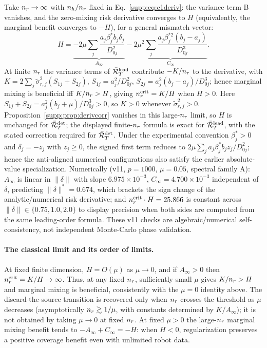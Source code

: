 Take $n_r \to \infty$ with $n_h/n_r$ fixed in Eq.~\eqref{supp:eq:c1deriv}: the variance term B vanishes, and the zero-mixing risk derivative converges to $H$ (equivalently, the marginal benefit converges to $-H$), for a general mismatch vector:
\begin{equation}
  H = \underbrace{-2\mu \sum_j \frac{a_j\beta^*_j b_j \delta_j}{D_{0j}^2}}_{A_\infty} - \underbrace{2\mu^2 \sum_j \frac{a_j\beta_j^{*2}(b_j - a_j)}{D_{0j}^3}}_{C_\infty}.
  \label{supp:eq:h}
\end{equation}
At finite $n_r$ the variance terms of $\bar{\mathcal{R}}_T^{\mathrm{lead}}$ contribute $-K/n_r$ to the derivative, with $K = 2\sum_j\tilde\sigma_{r,j}^2(S_{1j} + S_{2j})$, $S_{1j} = a_j^2/D_{0j}^2$, $S_{2j} = a_j^2(b_j-a_j)/D_{0j}^3$; hence marginal mixing is beneficial iff $K/n_r > H$, giving $n_r^{\mathrm{crit}} = K/H$ when $H > 0$. Here $S_{1j}+S_{2j}=a_j^2(b_j+\mu)/D_{0j}^3>0$, so $K>0$ whenever $\tilde\sigma_{r,j}^2>0$.
Proposition~\ref{supp:prop:derivcorr} vanishes in this large-$n_r$ limit, so $H$ is unchanged for $\bar{\mathcal{R}}_T^{\det}$; the displayed finite-$n_r$ formula is exact for $\bar{\mathcal{R}}_T^{\mathrm{lead}}$, with the stated correction required for $\bar{\mathcal{R}}_T^{\det}$.
Under the experimental convention $\beta_j^*>0$ and $\delta_j=-z_j$ with $z_j\ge0$, the signed first term reduces to $2\mu\sum_j a_j\beta_j^*b_jz_j/D_{0j}^2$; hence the anti-aligned numerical configurations also satisfy the earlier absolute-value specialization.
Numerically (v11, $p = 1000$, $\mu = 0.05$, spectral family A): $A_\infty$ is linear in $\|\delta\|$ with slope $6.975\times10^{-3}$, $C_\infty = 4.700\times10^{-3}$ independent of $\delta$, predicting $\|\delta\|^* = 0.674$, which brackets the sign change of the analytic/numerical risk derivative; and $n_r^{\mathrm{crit}}\cdot H = 25.866$ is constant across $\|\delta\| \in \{0.75, 1.0, 2.0\}$ to display precision when both sides are computed from the same leading-order formula.
These v11 checks are algebraic/numerical self-consistency, not independent Monte-Carlo phase validation.

\paragraph{The classical limit and its order of limits.}
At fixed finite dimension, $H=O(\mu)$ as $\mu\to0$, and if $A_\infty>0$ then $n_r^{\mathrm{crit}}=K/H\to\infty$.
Thus, at any fixed $n_r$, sufficiently small $\mu$ gives $K/n_r>H$ and marginal mixing is beneficial, consistently with the $\mu=0$ identity above.
The discard-the-source transition is recovered only when $n_r$ crosses the threshold as $\mu$ decreases (asymptotically $n_r\gtrsim1/\mu$, with constants determined by $K/A_\infty$); it is not obtained by taking $\mu\to0$ at fixed $n_r$.
At fixed $\mu > 0$ the large-$n_r$ marginal mixing benefit tends to $-A_\infty+C_\infty=-H$: when $H<0$, regularization preserves a positive coverage benefit even with unlimited robot data.

